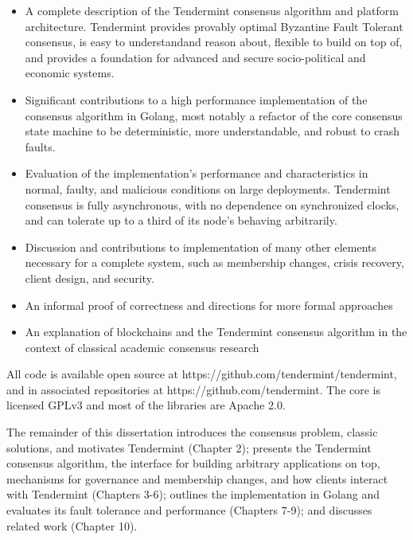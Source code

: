 \begin{itemize}  

    \item A complete description of the Tendermint consensus algorithm and platform architecture. Tendermint provides provably optimal Byzantine Fault Tolerant consensus, is easy to understandand reason about, flexible to build on top of, and provides a foundation for advanced and secure socio-political and economic systems. 

    \item Significant contributions to a high performance implementation of the consensus algorithm in Golang, most notably a refactor of the core consensus state machine to be deterministic, more understandable, and robust to crash faults. 

    \item Evaluation of the implementation's performance and characteristics in normal, faulty, and malicious conditions on large deployments. Tendermint consensus is fully asynchronous, with no dependence on synchronized clocks, and can tolerate up to a third of its node's behaving arbitrarily. 

    \item Discussion and contributions to implementation of many other elements necessary for a complete system, such as membership changes, crisis recovery, client design, and security.

    \item An informal proof of correctness and directions for more formal approaches

    \item An explanation of blockchains and the Tendermint consensus algorithm in the context of classical academic consensus research 
\end{itemize}

All code is available open source at https://github.com/tendermint/tendermint, and in associated repositories at https://github.com/tendermint. 
The core is licensed GPLv3 and most of the libraries are Apache 2.0.

The remainder of this dissertation introduces the consensus problem, classic solutions, and motivates Tendermint (Chapter 2);
presents the Tendermint consensus algorithm, the interface for building arbitrary applications on top, mechanisms for governance and membership changes, 
and how clients interact with Tendermint (Chapters 3-6); 
outlines the implementation in Golang and evaluates its fault tolerance and performance (Chapters 7-9);
and discusses related work (Chapter 10).
